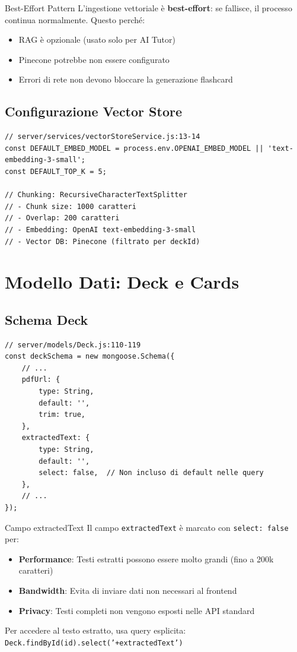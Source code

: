 \documentclass[11pt,a4paper]{article}
\begin{document}
\begin{tipbox}{Best-Effort Pattern}
L'ingestione vettoriale è \textbf{best-effort}: se fallisce, il processo continua normalmente. Questo perché:
\begin{itemize}
    \item RAG è opzionale (usato solo per AI Tutor)
    \item Pinecone potrebbe non essere configurato
    \item Errori di rete non devono bloccare la generazione flashcard
\end{itemize}
\end{tipbox}

\subsection{Configurazione Vector Store}

\begin{lstlisting}[caption=Configurazione Pinecone]
// server/services/vectorStoreService.js:13-14
const DEFAULT_EMBED_MODEL = process.env.OPENAI_EMBED_MODEL || 'text-embedding-3-small';
const DEFAULT_TOP_K = 5;

// Chunking: RecursiveCharacterTextSplitter
// - Chunk size: 1000 caratteri
// - Overlap: 200 caratteri
// - Embedding: OpenAI text-embedding-3-small
// - Vector DB: Pinecone (filtrato per deckId)
\end{lstlisting}

\section{Modello Dati: Deck e Cards}

\subsection{Schema Deck}

\begin{lstlisting}[caption=Schema Deck - Campi Rilevanti PDF]
// server/models/Deck.js:110-119
const deckSchema = new mongoose.Schema({
    // ...
    pdfUrl: {
        type: String,
        default: '',
        trim: true,
    },
    extractedText: {
        type: String,
        default: '',
        select: false,  // Non incluso di default nelle query
    },
    // ...
});
\end{lstlisting}

\begin{importantbox}{Campo extractedText}
Il campo \texttt{extractedText} è marcato con \texttt{select: false} per:
\begin{itemize}
    \item \textbf{Performance}: Testi estratti possono essere molto grandi (fino a 200k caratteri)
    \item \textbf{Bandwidth}: Evita di inviare dati non necessari al frontend
    \item \textbf{Privacy}: Testi completi non vengono esposti nelle API standard
\end{itemize}

Per accedere al testo estratto, usa query esplicita: \texttt{Deck.findById(id).select('+extractedText')}
\end{importantbox}
\end{document}
